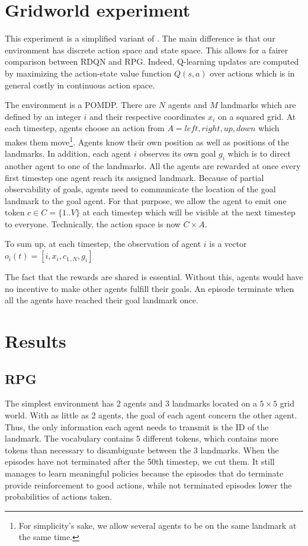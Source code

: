\documentclass{article} %
\begin{document}
\section{Gridworld experiment}
This experiment is a simplified variant of \cite{mordatch2017emergence}. The main difference is that our environment has discrete action space and state space. This allows for a fairer comparison between RDQN and RPG. Indeed, Q-learning updates are computed by maximizing the action-state value function $Q(s,a)$ over actions which is in general costly in continuous action space.

The environment is a POMDP. There are $N$ agents and $M$ landmarks which are defined by an integer $i$ and their respective coordinates $x_i$ on a squared grid. At each timestep, agents choose an action from $A={left, right, up, down}$ which makes them move\footnote{For simplicity's sake, we allow several agents to be on the same landmark at the same time.}. Agents know their own position as well as positions of the landmarks. In addition, each agent $i$ observes its own goal $g_i$ which is to direct another agent to one of the landmarks. All the agents are rewarded at once every first timestep one agent reach its assigned landmark. Because of partial observability of goals, agents need to communicate the location of the goal landmark to the goal agent. For that purpose, we allow the agent to emit one token $c \in C = \{1..V\}$ at each timestep which will be visible at the next timestep to everyone. Technically, the action space is now $C \times A$.

To sum up, at each timestep, the observation of agent $i$ is a vector $o_i(t) = [i, x_i, c_{1..N}, g_i]$

The fact that the rewards are shared is essential. Without this, agents would have no incentive to make other agents fulfill their goals. An episode terminate when all the agents have reached their goal landmark once.

\section{Results}
\subsection{RPG}
The simplest environment has 2 agents and 3 landmarks located on a $5 \times 5$ grid world. With as little as 2 agents, the goal of each agent concern the other agent. Thus, the only information each agent needs to transmit is the ID of the landmark. The vocabulary contains 5 different tokens, which contains more tokens than necessary to disambiguate between the 3 landmarks. When the episodes have not terminated after the 50th timestep, we cut them. It still manages to learn meaningful policies because the episodes that do terminate provide reinforcement to good actions, while not terminated episodes lower the probabilities of actions taken.
\end{document}
